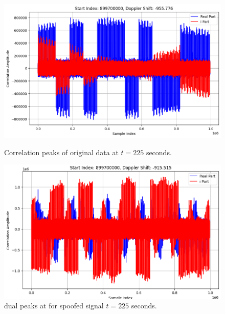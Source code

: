 \documentclass[12pt]{report}
\begin{document}
\begin{figure}[H]
  \centering
  \begin{minipage}{0.48\textwidth}
    \centering
    \includegraphics[width=\textwidth]{t225.png}
    \caption{Correlation peaks of original data at $t = 225$ seconds.}
    \label{fig:t225}
  \end{minipage}
  \hfill
  \begin{minipage}{0.48\textwidth}
    \centering
    \includegraphics[width=\textwidth]{t225_sp.png}
    \caption{dual peaks at for spoofed signal $t = 225$ seconds.}
    \label{fig:t225_sp}
  \end{minipage}
\end{figure}
\end{document}
